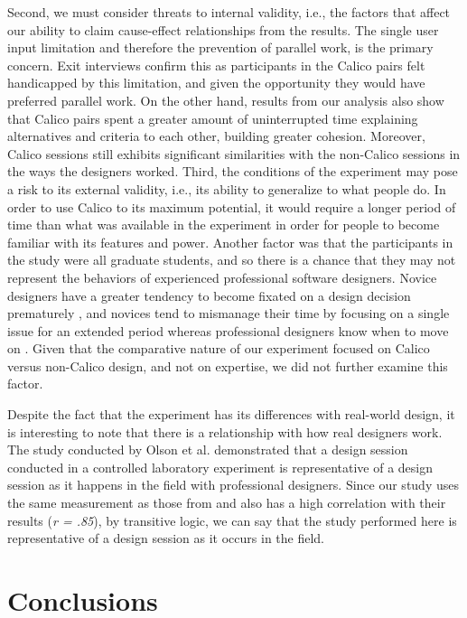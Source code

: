 Second, we must consider threats to internal validity, i.e., the factors that affect our ability to claim cause-effect relationships from the results. The single user input limitation and therefore the prevention of parallel work, is the primary concern. Exit interviews confirm this as participants in the Calico pairs felt handicapped by this limitation, and given the opportunity they would have preferred parallel work. On the other hand, results from our analysis also show that Calico pairs spent a greater amount of uninterrupted time explaining alternatives and criteria to each other, building greater cohesion. Moreover, Calico sessions still exhibits significant similarities with the non-Calico sessions in the ways the designers worked.  
Third, the conditions of the experiment may pose a risk to its external validity, i.e., its ability to generalize to what people do. In order to use Calico to its maximum potential, it would require a longer period of time than what was available in the experiment in order for people to become familiar with its features and power. Another factor was that the participants in the study were all graduate students, and so there is a chance that they may not represent the behaviors of experienced professional software designers. Novice designers have a greater tendency to become fixated on a design decision prematurely \citep{Ball}, and novices tend to mismanage their time by focusing on a single issue for an extended period whereas professional designers know when to move on \citep{Baker}. Given that the comparative nature of our experiment focused on Calico versus non-Calico design, and not on expertise, we did not further examine this factor.

Despite the fact that the experiment has its differences with real-world design, it is interesting to note that there is a relationship with how real designers work. The study conducted by Olson et al. \citep{Olsonb} demonstrated that a design session conducted in a controlled laboratory experiment is representative of a design session as it happens in the field with professional designers. Since our study uses the same measurement as those from \citep{Olsonb} and also has a high correlation with their results (\emph{r = .85}), by transitive logic, we can say that the study performed here is representative of a design session as it occurs in the field.

\section{Conclusions}
\label{conclusions}

